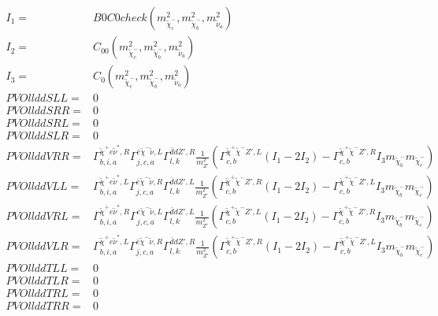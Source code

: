 \documentclass[A4,landscape]{article}
\begin{document}
\begin{align} 
I_1= & B0C0check(m^2_{\tilde{\chi}^-_{{c}}}, m^2_{\tilde{\chi}^-_{{b}}}, m^2_{\tilde{\nu}_{{a}}}) \\ 
I_2= & C_{00}(m^2_{\tilde{\chi}^-_{{c}}}, m^2_{\tilde{\chi}^-_{{b}}}, m^2_{\tilde{\nu}_{{a}}}) \\ 
I_3= & C_0(m^2_{\tilde{\chi}^-_{{c}}}, m^2_{\tilde{\chi}^-_{{b}}}, m^2_{\tilde{\nu}_{{a}}}) \\ 
  PVOllddSLL= & 0 \\ 
  PVOllddSRR= & 0 \\ 
  PVOllddSRL= & 0 \\ 
  PVOllddSLR= & 0 \\ 
  PVOllddVRR= &  \Gamma^{\tilde{\chi}^+e \tilde{\nu}^*,R}_{b, i, a} \Gamma^{\bar{e}\tilde{\chi}^- \tilde{\nu} ,L}_{j, c, a} \Gamma^{\bar{d}d {Z'} ,R}_{l, k} \frac{1}{m^2_{{Z'}}} (\Gamma^{\tilde{\chi}^+\tilde{\chi}^- {Z'} ,L}_{c, b} (I_1 - 2 I_2) - \Gamma^{\tilde{\chi}^+\tilde{\chi}^- {Z'} ,R}_{c, b} I_3 m_{\tilde{\chi}^-_{{b}}} m_{\tilde{\chi}^-_{{c}}}) \\ 
  PVOllddVLL= &  \Gamma^{\tilde{\chi}^+e \tilde{\nu}^*,L}_{b, i, a} \Gamma^{\bar{e}\tilde{\chi}^- \tilde{\nu} ,R}_{j, c, a} \Gamma^{\bar{d}d {Z'} ,L}_{l, k} \frac{1}{m^2_{{Z'}}} (\Gamma^{\tilde{\chi}^+\tilde{\chi}^- {Z'} ,R}_{c, b} (I_1 - 2 I_2) - \Gamma^{\tilde{\chi}^+\tilde{\chi}^- {Z'} ,L}_{c, b} I_3 m_{\tilde{\chi}^-_{{b}}} m_{\tilde{\chi}^-_{{c}}}) \\ 
  PVOllddVRL= &  \Gamma^{\tilde{\chi}^+e \tilde{\nu}^*,R}_{b, i, a} \Gamma^{\bar{e}\tilde{\chi}^- \tilde{\nu} ,L}_{j, c, a} \Gamma^{\bar{d}d {Z'} ,L}_{l, k} \frac{1}{m^2_{{Z'}}} (\Gamma^{\tilde{\chi}^+\tilde{\chi}^- {Z'} ,L}_{c, b} (I_1 - 2 I_2) - \Gamma^{\tilde{\chi}^+\tilde{\chi}^- {Z'} ,R}_{c, b} I_3 m_{\tilde{\chi}^-_{{b}}} m_{\tilde{\chi}^-_{{c}}}) \\ 
  PVOllddVLR= &  \Gamma^{\tilde{\chi}^+e \tilde{\nu}^*,L}_{b, i, a} \Gamma^{\bar{e}\tilde{\chi}^- \tilde{\nu} ,R}_{j, c, a} \Gamma^{\bar{d}d {Z'} ,R}_{l, k} \frac{1}{m^2_{{Z'}}} (\Gamma^{\tilde{\chi}^+\tilde{\chi}^- {Z'} ,R}_{c, b} (I_1 - 2 I_2) - \Gamma^{\tilde{\chi}^+\tilde{\chi}^- {Z'} ,L}_{c, b} I_3 m_{\tilde{\chi}^-_{{b}}} m_{\tilde{\chi}^-_{{c}}}) \\ 
  PVOllddTLL= & 0 \\ 
  PVOllddTLR= & 0 \\ 
  PVOllddTRL= & 0 \\ 
  PVOllddTRR= & 0 \\ 
\end{align} 
\end{document}
